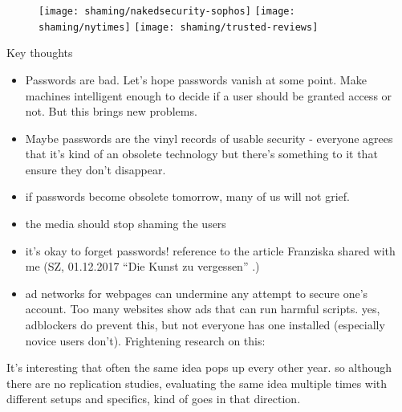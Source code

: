 \begin{figure}[htpb]
	\centering
	\texttt{[image: shaming/nakedsecurity-sophos]}
	\texttt{[image: shaming/nytimes]}
	\texttt{[image: shaming/trusted-reviews]}
\end{figure}

Key thoughts

\begin{itemize}
\item Passwords are bad. Let's hope passwords vanish at some point. Make machines intelligent enough to decide if a user should be granted access or not. But this brings new problems.
\item Maybe passwords are the vinyl records of usable security - everyone agrees that it's kind of an obsolete technology but there's something to it that ensure they don't disappear. %
 \item  if passwords become obsolete tomorrow, many of us will not grief. 
 \item  the media should stop shaming the users 
 \item  it's okay to forget passwords! reference to the article Franziska shared with me (SZ,  01.12.2017 ``Die Kunst zu vergessen'' .)
 \item 	ad networks for webpages can undermine any attempt to secure one's account. Too many websites show ads that can run harmful scripts. yes, adblockers do prevent this, but not everyone has one installed (especially novice users don't). Frightening research on this: 
\end{itemize}

It's interesting that often the same idea pops up every other year. so although there are no replication studies, evaluating the same idea multiple times with different setups and specifics, kind of goes in that direction. 



